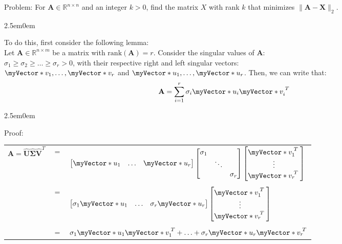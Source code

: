 \documentclass{book}
\newcommand{\hTwo}{%
   \color{MidnightBlue}%
   \fontsize{13}{15}\selectfont%
}
\newcommand{\hThree}{%
   \color{PineGreen}
   \fontsize{13}{15}\selectfont%
}
\newenvironment{myIndent}{%
   \begin{adjustwidth}{2.5em}{0em}%
}{%
   \end{adjustwidth}%
}
\newcommand{\rank}[1]{\mathrm{rank}(#1)}
\newcommand{\retTwo}{\hfill\bigbreak}
\newcommand{\mVecAst}[1]{\myVector*{#1}}
\newcommand{\mMat}[1]{\mathbf{#1}}
\begin{document}
   Problem: For $\mMat{A} \in \mathbb{R}^{n \times n}$ and an integer $k > 0$, find the matrix $X$ with rank $k$ that minimizes $\|\mMat{A} - \mMat{X}\|_2$. \retTwo

   {\begin{myIndent}\hTwo
      To do this, first consider the following lemma:\\
      Let $\mMat{A} \in \mathbb{R}^{n\times m}$ be a matrix with $\rank{\mMat{A}} = r$. Consider the singular values of $\mMat{A}$:\\ $\sigma_1 \geq \sigma_2 \geq \ldots \geq \sigma_r > 0$, with their respective right and left singular vectors: \\ $\mVecAst{v}_1, \ldots, \mVecAst{v}_r$ and $\mVecAst{u}_1, \ldots, \mVecAst{u}_r$. Then, we can write that:
      \[\mMat{A} = \sum\limits_{i=1}^{r}{\sigma_i\mVecAst{u}_i\mVecAst{v}_i^{\phantom{|}T}}\]

      {\begin{myIndent} \hThree
         Proof:\\
         \begin{tabular}{ l c l }
            $\mMat{A}=\hat{\mMat{U}}\hat{\bm{\Sigma}}\hat{\mMat{V}}^T$&$=$&$\begin{bmatrix}
               \mVecAst{u}_1 & \ldots & \mVecAst{u}_r
            \end{bmatrix}
            \begin{bmatrix}
               \sigma_1 & & \\
               & \ddots & \\
               & & \sigma_r \\
            \end{bmatrix}
            \begin{bmatrix}
               \mVecAst{v}_1^{\phantom{|}T\phantom{|}} \\ \vdots \\ \mVecAst{v}_r^{\phantom{|}T\phantom{|}}
            \end{bmatrix}$ \\ \\

            & $=$ & $\begin{bmatrix}
               \sigma_1\mVecAst{u}_1 & \ldots & \sigma_r\mVecAst{u}_r
            \end{bmatrix} \begin{bmatrix}
               \mVecAst{v}_1^{\phantom{|}T\phantom{|}} \\ \vdots \\ \mVecAst{v}_r^{\phantom{|}T\phantom{|}}
            \end{bmatrix}$ \\ \\
            & $=$ & $\sigma_1\mVecAst{u}_1\mVecAst{v}_1^{\phantom{|}T} + \ldots + \sigma_r\mVecAst{u}_r\mVecAst{v}_r^{\phantom{|}T} $
         \end{tabular} \retTwo
         

\end{myIndent}}
\end{myIndent}}
\end{document}
